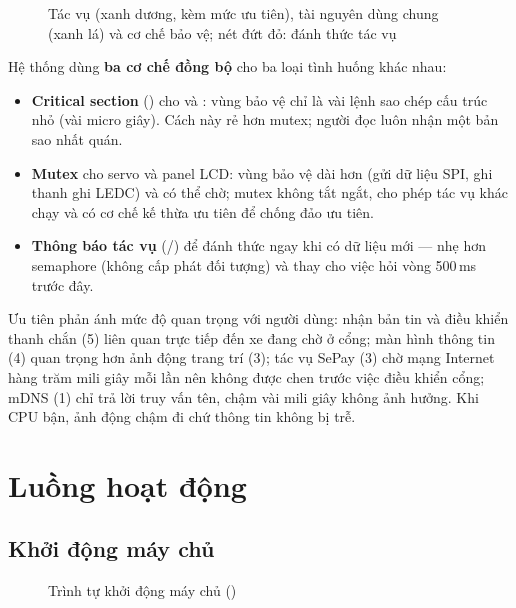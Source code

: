 \begin{figure}[H]
\centering
{}
\caption{Tác vụ (xanh dương, kèm mức ưu tiên), tài nguyên dùng chung (xanh lá) và cơ chế bảo vệ; nét đứt đỏ: đánh thức tác vụ}\label{fig:tasks}
\end{figure}

Hệ thống dùng \textbf{ba cơ chế đồng bộ} cho ba loại tình huống khác nhau:
\begin{itemize}
\item \textbf{Critical section} () cho  và
  : vùng bảo vệ chỉ là vài lệnh sao chép cấu trúc nhỏ (vài micro
  giây). Cách này rẻ hơn mutex; người đọc luôn nhận một bản sao nhất quán.
\item \textbf{Mutex} cho servo và panel LCD: vùng bảo vệ dài hơn (gửi dữ liệu SPI,
  ghi thanh ghi LEDC) và có thể chờ; mutex không tắt ngắt, cho phép tác vụ khác chạy
  và có cơ chế kế thừa ưu tiên để chống đảo ưu tiên.
\item \textbf{Thông báo tác vụ} (/) để
   đánh thức  ngay khi có dữ liệu mới — nhẹ hơn
  semaphore (không cấp phát đối tượng) và thay cho việc hỏi vòng 500\,ms trước đây.
\end{itemize}

\begin{lydo}
Ưu tiên phản ánh mức độ quan trọng với người dùng: nhận bản tin và điều khiển thanh
chắn (5) liên quan trực tiếp đến xe đang chờ ở cổng; màn hình thông tin (4) quan
trọng hơn ảnh động trang trí (3); tác vụ SePay (3) chờ mạng Internet hàng trăm mili
giây mỗi lần nên không được chen trước việc điều khiển cổng; mDNS (1) chỉ trả lời truy vấn tên, chậm vài mili
giây không ảnh hưởng. Khi CPU bận, ảnh động chậm đi chứ thông tin không bị trễ.
\end{lydo}

\section{Luồng hoạt động}\label{sec:luong}
\subsection{Khởi động máy chủ}
\begin{figure}[H]
\centering
{}
\caption{Trình tự khởi động máy chủ ()}\label{fig:boot}
\end{figure}

